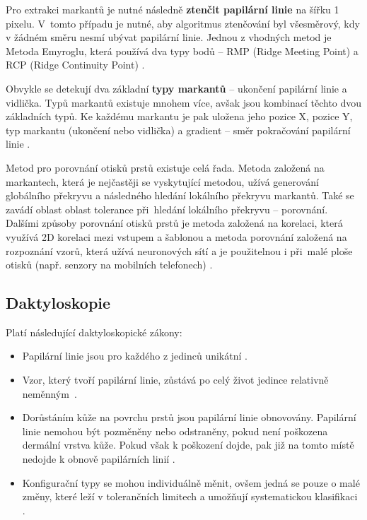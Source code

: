 Pro extrakci markantů je nutné následně \textbf{ztenčit papilární linie} na šířku 1 pixelu. V~tomto případu je nutné, aby algoritmus ztenčování byl všesměrový, kdy v žádném směru nesmí ubývat papilární linie. Jednou z vhodných metod je Metoda Emyroglu, která používá dva typy bodů -- RMP (Ridge Meeting Point) a RCP (Ridge Continuity Point) \cite{BIOopora}.

Obvykle se detekují dva základní \textbf{typy markantů} -- ukončení papilární linie a vidlička. Typů markantů existuje mnohem více, avšak jsou kombinací těchto dvou základních typů. Ke každému markantu je pak uložena jeho pozice X, pozice Y, typ markantu (ukončení nebo vidlička) a gradient -- směr pokračování papilární linie \cite{BIOopora}.

Metod pro porovnání otisků prstů existuje celá řada. Metoda založená na markantech, která je nejčastěji se vyskytující metodou, užívá generování globálního překryvu a následného hledání lokálního překryvu markantů. Také se zavádí oblast oblast tolerance při~hledání lokálního překryvu -- porovnání. Dalšími způsoby porovnání otisků prstů je metoda založená na korelaci, která využívá 2D korelaci mezi vstupem a šablonou a metoda porovnání založená na rozpoznání vzorů, která užívá neuronových sítí a je použitelnou i při~malé ploše otisků (např. senzory na mobilních telefonech) \cite{BIOotiskyLecture}.



\subsection{Daktyloskopie}
Platí následující daktyloskopické zákony:
\begin{itemize}
    \item Papilární linie jsou pro každého z jedinců unikátní \cite{BIOopora}.
    \item Vzor, který tvoří papilární linie, zůstává po celý život jedince relativně neměnným~\cite{BIOopora}. 
    \item Dorůstáním kůže na povrchu prstů jsou papilární linie obnovovány. Papilární linie nemohou být pozměněny nebo odstraněny, pokud není poškozena dermální vrstva kůže. Pokud však k poškození dojde, pak již na tomto místě nedojde k obnově papilárních linií \cite{BIOopora}.
    \item Konfigurační typy se mohou individuálně měnit, ovšem jedná se pouze o malé změny, které leží v tolerančních limitech a umožňují systematickou klasifikaci \cite{BIOopora}.
\end{itemize}
